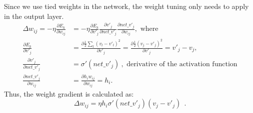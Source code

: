 Since we use tied weights in the network, the weight tuning only needs to apply in the output layer.
\begin{equation}
\begin{aligned}
\Delta w_{ij} = -\eta \frac{\partial E_k}{\partial w_{ij}} &= -\eta \frac{\partial E_k}{\partial v'_j} \frac{\partial v'_j}{\partial net\_v'_j} \frac{\partial net\_v'_j}{\partial w_{ij}}, \textrm{ where} \\
\frac{\partial E_k}{\partial v'_j} &= \frac{\partial \frac{1}{2} \sum_l (v_l - {v'}_l)^2}{\partial v'_j}= \frac{\partial \frac{1}{2}(v_j - {v'}_j)^2}{\partial v'_j}= v'_j - v_j, \\
\frac{\partial v'_j}{\partial net\_v'_j} &= \sigma'(net\_{v'_j})~, \textrm{~derivative of the activation function} \\
\frac{\partial net\_v'_j}{\partial w_{ij}} &= \frac{\partial h_i w_{ij}}{\partial w_{ij}} = h_i.
\end{aligned}
\end{equation}
Thus, the weight gradient is calculated as:
\begin{equation}
\label{equ:ae_widrow_hoff}
\Delta w_{ij} = \eta h_i \sigma'(net\_{v'_j}) (v_j - v'_j)~~.
\end{equation}

